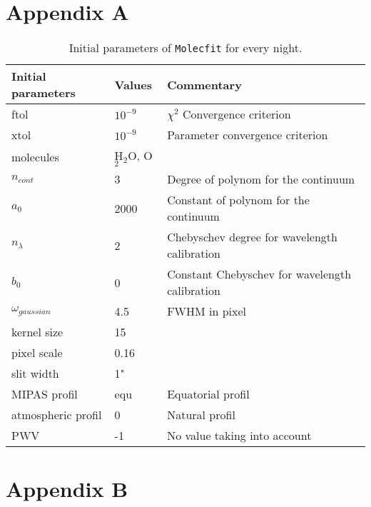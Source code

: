 \documentclass{aa}
\begin{document}
\begin{appendix}
\section{Appendix A}
\label{appendiceA}

\begin{table}[h]
\centering
\caption{Initial parameters of \texttt{Molecfit}  for every night.}\label{parametre molecfit}
\begin{tabular}{lll}
\hline
Initial parameters & Values & Commentary \\
\hline
ftol&$10^{-9}$& $\chi^{2}$ Convergence criterion \\
xtol&$10^{-9}$& Parameter convergence criterion\\
molecules&H$_{2}$O, O$_{2}$&  \\
$n_{cont}$ &3& Degree of polynom for the continuum \\
$a_{0}$&2000& Constant of polynom for the continuum\\
$n_{\lambda}$&2& Chebyschev degree for wavelength calibration\\
$b_{0}$&0& Constant Chebyschev for wavelength calibration\\
$\omega_{gaussian}$&4.5&FWHM in pixel\\
kernel size&15& \\
pixel scale&0.16& \\
slit width&1"& \\
MIPAS profil &equ& Equatorial profil\\
atmospheric profil&0& Natural profil\\
PWV &-1& No value taking into account\\
\hline
\end{tabular}
\end{table}


\section{Appendix B}
\label{appendiceB}


\end{appendix}
\end{document}
